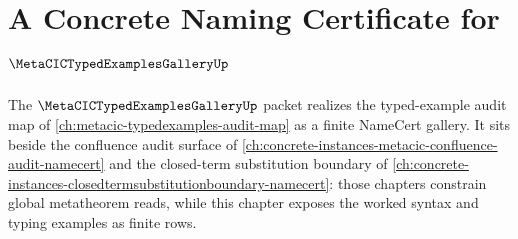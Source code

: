 \chapter{A Concrete Naming Certificate for $\MetaCICTypedExamplesGalleryUp$}
\label{ch:concrete-instances-metacictypedexamplesgallery-namecert}

The $\MetaCICTypedExamplesGalleryUp$ packet realizes the typed-example audit map of \autoref{ch:metacic-typedexamples-audit-map} as a finite NameCert gallery. It sits beside the confluence audit surface of \autoref{ch:concrete-instances-metacic-confluence-audit-namecert} and the closed-term substitution boundary of \autoref{ch:concrete-instances-closedtermsubstitutionboundary-namecert}: those chapters constrain global metatheorem reads, while this chapter exposes the worked syntax and typing examples as finite rows.

